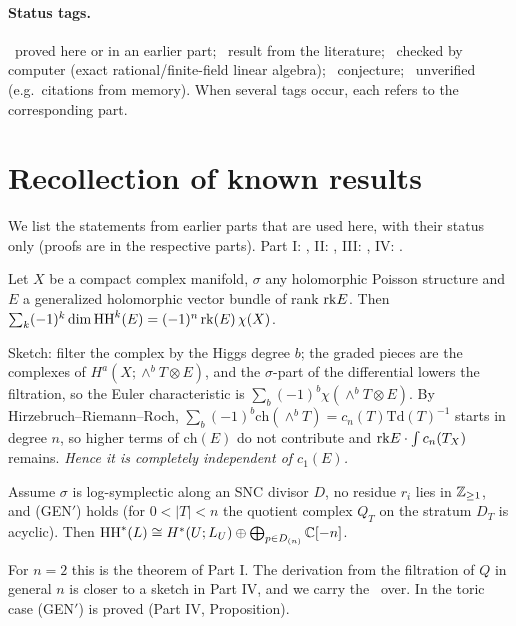 \paragraph{Status tags.} \tP\ proved here or in an earlier part; \tC\ result from the literature; \tV\ checked by computer (exact rational/finite-field linear algebra); \tK\ conjecture; \tQ\ unverified (e.g.\ citations from memory). When several tags occur, each refers to the corresponding part.

\section{Recollection of known results}\label{sec:recall}
We list the statements from earlier parts that are used here, with their status only (proofs are in the respective parts). Part I: \cite{PartI}, II: \cite{PartII}, III: \cite{PartIII}, IV: \cite{PartIV}.

\begin{thm}\label{thm:E}
Let $X$ be a compact complex manifold, $\sigma$ any holomorphic Poisson structure and $E$ a generalized holomorphic vector bundle of rank $\mathrm{rk} E$. Then $\sum_k(-1)^k\dim\mathrm{HH}^k(E)=(-1)^n\,\mathrm{rk}(E)\,\chi(X)$.
\end{thm}
Sketch: filter the complex by the Higgs degree $b$; the graded pieces are the complexes of $H^a(X;\wedge^bT\otimes E)$, and the $\sigma$-part of the differential lowers the filtration, so the Euler characteristic is $\sum_b(-1)^b\chi(\wedge^bT\otimes E)$. By Hirzebruch--Riemann--Roch, $\sum_b(-1)^b\mathrm{ch}(\wedge^bT)=c_n(T)\mathrm{Td}(T)^{-1}$ starts in degree $n$, so higher terms of $\mathrm{ch}(E)$ do not contribute and $\mathrm{rk} E\cdot\int c_n(T_X)$ remains. \emph{Hence it is completely independent of $c_1(E)$.}

\begin{thm}\label{thm:R}
Assume $\sigma$ is log-symplectic along an SNC divisor $D$, no residue $r_i$ lies in $\mathbb Z_{\ge1}$, and (GEN$'$) holds (for $0<|T|<n$ the quotient complex $Q_T$ on the stratum $D_T$ is acyclic). Then $\mathrm{HH}^*(L)\cong H^*(U;L_U)\oplus\bigoplus_{p\in D_{(n)}}\mathbb C[-n]$.
\end{thm}
For $n=2$ this is the theorem of Part I. The derivation from the filtration of $Q$ in general $n$ is closer to a sketch in Part IV, and we carry the \tQ\ over. In the toric case (GEN$'$) is proved (Part IV, Proposition).

